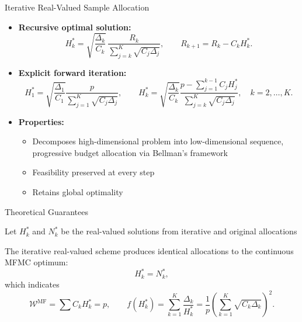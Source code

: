\documentclass{beamer}
\begin{document}
\begin{frame}{Iterative Real-Valued Sample Allocation}
\begin{itemize}[leftmargin=5pt] 
\item \textcolor{myblue3}{\bf Recursive optimal solution:}
{\footnotesize
\[
H_k^* = \sqrt{\frac{\Delta_k}{C_k}} \,
\frac{R_k}{\sum_{j=k}^K\sqrt{C_j\Delta_j}},
\qquad 
R_{k+1} = R_k - C_k H_k^*.
\]
}
\item \textcolor{myblue3}{\bf  Explicit forward iteration:}
{\footnotesize
\[
H_1^* = \sqrt{\frac{\Delta_1}{C_1}} \frac{p}{\sum_{j=1}^K\sqrt{C_j\Delta_j}},
\qquad 
H_k^* = \sqrt{\frac{\Delta_k}{C_k}} 
\frac{p-\sum_{j=1}^{k-1}C_jH_j^*}{\sum_{j=k}^K\sqrt{C_j\Delta_j}}, \quad k=2,\ldots, K.
\]
}
\vspace{2mm}
\item \textcolor{myblue3}{\bf  Properties:}
{\footnotesize
\begin{itemize}[leftmargin=15pt] 
    \item[$\circ$] Decomposes high-dimensional problem into low-dimensional sequence, progressive budget allocation via Bellman’s framework
    \item[$\circ$] Feasibility preserved at every step
    \item[$\circ$] Retains global optimality 
\end{itemize}
}
\end{itemize}
\end{frame}








\begin{frame}{Theoretical Guarantees}

{\footnotesize
Let $H_k^*$ and $N_k^*$ be the real-valued solutions from iterative and original allocations
}
\begin{theorem}
{\footnotesize
The iterative real-valued scheme produces identical allocations to the continuous MFMC optimum:
\[
H_k^* = N_k^*,
\]
which indicates
\[
\mathcal{W}^{\text{MF}}=\sum C_k H_k^* = p, \qquad  
f(H_k^*) = \sum_{k=1}^K \frac{\Delta_k}{H_k^*} = \frac{1}{p} \left(\sum_{k=1}^K \sqrt{C_k\Delta_k}\right)^2.
\]
}
\end{theorem}

\end{frame}
\end{document}
